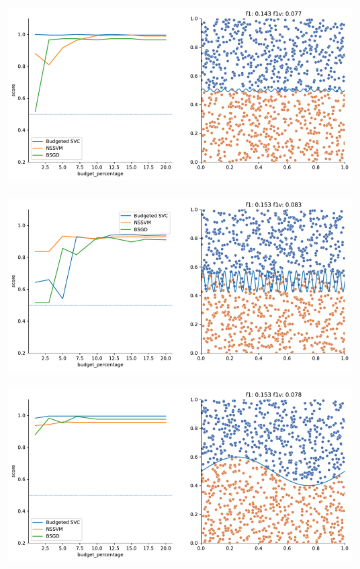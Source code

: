 \begin{appendices}
\begin{figure}
\begin{subfigure}{.5\textwidth}
    \end{subfigure}
    \begin{subfigure}{.5\textwidth}
        \centering
        \includegraphics[width=\textwidth]{img/comp_new/6.pdf}
    \end{subfigure}%
    \hfill
    \begin{subfigure}{.5\textwidth}
        \centering
        \includegraphics[width=\textwidth]{img/comp_new/9.pdf}
    \end{subfigure}
    \begin{subfigure}{.5\textwidth}
        \centering
        \includegraphics[width=\textwidth]{img/comp_new/10.pdf}

\end{subfigure}
\end{figure}
\end{appendices}

